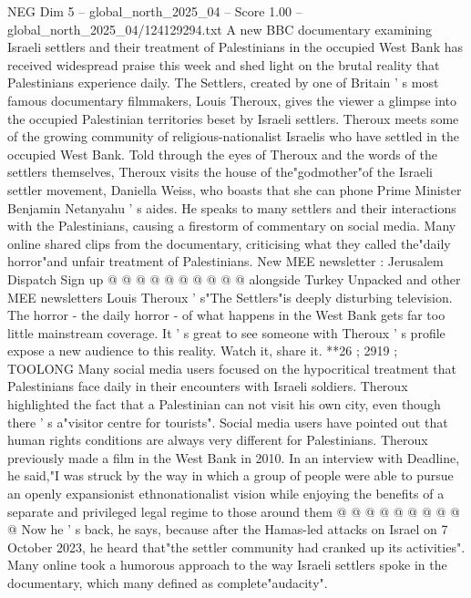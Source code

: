 \begin{textsample}{NEG Dim 5 – global\_north\_2025\_04 – Score 1.00 – global\_north\_2025\_04/124129294.txt}  \label{ex:f5_neg_367}
A new BBC documentary examining Israeli settlers and their treatment of Palestinians in the occupied West Bank has received widespread praise this week and shed light on the brutal reality that Palestinians experience daily.
The Settlers, created by one of Britain ' s most famous documentary filmmakers, Louis Theroux, gives the viewer a glimpse into the occupied Palestinian territories beset by Israeli settlers.
Theroux meets some of the growing community of religious-nationalist Israelis who have settled in the occupied West Bank.
Told through the eyes of Theroux and the words of the settlers themselves, Theroux visits the house of the"godmother"of the Israeli settler movement, Daniella Weiss, who boasts that she can phone Prime Minister Benjamin Netanyahu ' s aides.
He speaks to many settlers and their interactions with the Palestinians, causing a firestorm of commentary on social media.
Many online shared clips from the documentary, criticising what they called the"daily horror"and unfair treatment of Palestinians.
New MEE newsletter : Jerusalem Dispatch Sign up @ @ @ @ @ @ @ @ @ @ alongside Turkey Unpacked and other MEE newsletters Louis Theroux ' s"The Settlers"is deeply disturbing television.
The horror - the daily horror - of what happens in the West Bank gets far too little mainstream coverage.
It ' s great to see someone with Theroux ' s profile expose a new audience to this reality.
Watch it, share it. **26 ; 2919 ; TOOLONG Many social media users focused on the hypocritical treatment that Palestinians face daily in their encounters with Israeli soldiers.
Theroux highlighted the fact that a Palestinian can not visit his own city, even though there ' s a"visitor centre for tourists".
Social media users have pointed out that human rights conditions are always very different for Palestinians.
Theroux previously made a film in the West Bank in 2010.
In an interview with Deadline, he said,"I was struck by the way in which a group of people were able to pursue an openly expansionist ethnonationalist vision while enjoying the benefits of a separate and privileged legal regime to those around them @ @ @ @ @ @ @ @ @ @ Now he ' s back, he says, because after the Hamas-led attacks on Israel on 7 October 2023, he heard that"the settler community had cranked up its activities".
Many online took a humorous approach to the way Israeli settlers spoke in the documentary, which many defined as complete"audacity".

\end{textsample}
